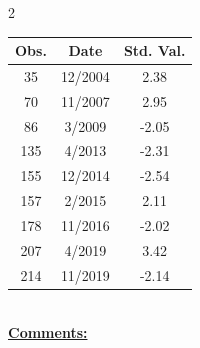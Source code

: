
\bigskip 
\begin{multicols}{2}{ 
\begin{tabular}{ccc}
\hline  Obs.  &  Date &  Std. Val. \\ 
\hline 
                       35 &       12/2004 &          2.38 \vspace{-.12in} \\  
                       70 &       11/2007 &          2.95 \vspace{-.12in} \\  
                       86 &        3/2009 &         -2.05 \vspace{-.12in} \\  
                      135 &        4/2013 &         -2.31 \vspace{-.12in} \\  
                      155 &       12/2014 &         -2.54 \vspace{-.12in} \\  
                      157 &        2/2015 &          2.11 \vspace{-.12in} \\  
                      178 &       11/2016 &         -2.02 \vspace{-.12in} \\  
                      207 &        4/2019 &          3.42 \vspace{-.12in} \\  
                      214 &       11/2019 &         -2.14 \vspace{-.12in} \\  
 \end{tabular} 
\\ 
 \columnbreak 
 \singlespacing 
 \underline{\textbf{Comments:}} \\ 
 \bigskip       

 } 
\end{multicols} 
